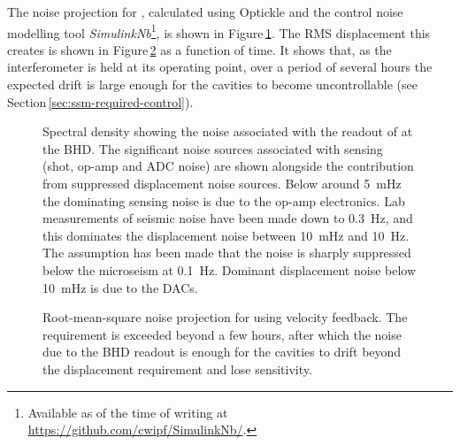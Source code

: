 The noise projection for \LMINUS{}, calculated using Optickle and the control noise modelling tool \emph{SimulinkNb}\footnote{Available as of the time of writing at \url{https://github.com/cwipf/SimulinkNb/}.}, is shown in Figure\,\ref{fig:readout-noise-velocity}. The \gls{RMS} \LMINUS{} displacement this creates is shown in Figure\,\ref{fig:readout-noise-velocity-rms} as a function of time. It shows that, as the interferometer is held at its operating point, over a period of several hours the expected drift is large enough for the cavities to become uncontrollable (see Section\,\ref{sec:ssm-required-control}).

\begin{figure}
  \centering
  
  \caption[Spectral density noise projection for \LMINUS{} using velocity feedback]{\label{fig:readout-noise-velocity}Spectral density showing the noise associated with the readout of \LMINUS{} at the BHD. The significant noise sources associated with sensing (shot, op-amp and ADC noise) are shown alongside the contribution from suppressed displacement noise sources. Below around \SI{5}{\milli\hertz} the dominating sensing noise is due to the op-amp electronics. Lab measurements of seismic noise have been made down to \SI{0.3}{\hertz}, and this dominates the displacement noise between \SI{10}{\milli\hertz} and \SI{10}{\hertz}. The assumption has been made that the noise is sharply suppressed below the microseism at \SI{0.1}{\hertz}. Dominant displacement noise below \SI{10}{\milli\hertz} is due to the \glspl{DAC}.}
\end{figure}

\begin{figure}
  \centering
  
  \caption[Root-mean-square noise projection for \LMINUS{} using velocity feedback]{\label{fig:readout-noise-velocity-rms}Root-mean-square noise projection for \LMINUS{} using velocity feedback. The requirement is exceeded beyond a few hours, after which the noise due to the BHD readout is enough for the cavities to drift beyond the displacement requirement and lose sensitivity.}
\end{figure}

